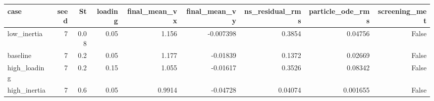\begin{tabular}{lrrrrrrrr}
\toprule
case & seed & St & loading & final\_mean\_vx & final\_mean\_vy & ns\_residual\_rms & particle\_ode\_rms & screening\_met \\
\midrule
low\_inertia & 7 & 0.08 & 0.05 & 1.156 & -0.007398 & 0.3854 & 0.04756 & False \\
baseline & 7 & 0.2 & 0.05 & 1.177 & -0.01839 & 0.1372 & 0.02669 & False \\
high\_loading & 7 & 0.2 & 0.15 & 1.055 & -0.01617 & 0.3526 & 0.08342 & False \\
high\_inertia & 7 & 0.6 & 0.05 & 0.9914 & -0.04728 & 0.04074 & 0.001655 & False \\
\bottomrule
\end{tabular}
